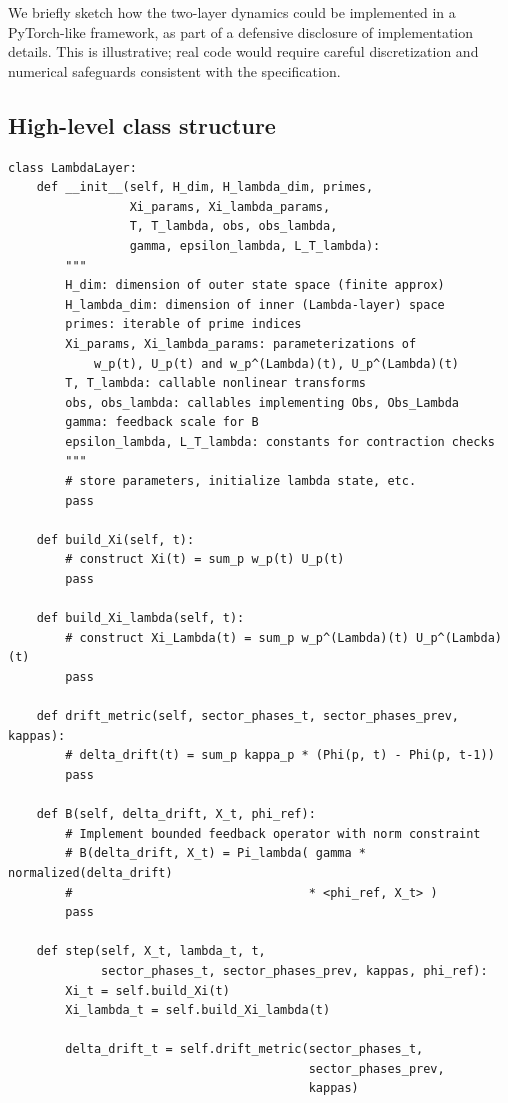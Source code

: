 \documentclass[11pt]{article}
\begin{document}
We briefly sketch how the two-layer dynamics could be implemented in a PyTorch-like framework, as part of a defensive disclosure of implementation details. This is illustrative; real code would require careful discretization and numerical safeguards consistent with the specification.

\subsection{High-level class structure}

\begin{verbatim}
class LambdaLayer:
    def __init__(self, H_dim, H_lambda_dim, primes, 
                 Xi_params, Xi_lambda_params,
                 T, T_lambda, obs, obs_lambda,
                 gamma, epsilon_lambda, L_T_lambda):
        """
        H_dim: dimension of outer state space (finite approx)
        H_lambda_dim: dimension of inner (Lambda-layer) space
        primes: iterable of prime indices
        Xi_params, Xi_lambda_params: parameterizations of 
            w_p(t), U_p(t) and w_p^(Lambda)(t), U_p^(Lambda)(t)
        T, T_lambda: callable nonlinear transforms
        obs, obs_lambda: callables implementing Obs, Obs_Lambda
        gamma: feedback scale for B
        epsilon_lambda, L_T_lambda: constants for contraction checks
        """
        # store parameters, initialize lambda state, etc.
        pass

    def build_Xi(self, t):
        # construct Xi(t) = sum_p w_p(t) U_p(t)
        pass

    def build_Xi_lambda(self, t):
        # construct Xi_Lambda(t) = sum_p w_p^(Lambda)(t) U_p^(Lambda)(t)
        pass

    def drift_metric(self, sector_phases_t, sector_phases_prev, kappas):
        # delta_drift(t) = sum_p kappa_p * (Phi(p, t) - Phi(p, t-1))
        pass

    def B(self, delta_drift, X_t, phi_ref):
        # Implement bounded feedback operator with norm constraint
        # B(delta_drift, X_t) = Pi_lambda( gamma * normalized(delta_drift)
        #                                 * <phi_ref, X_t> )
        pass

    def step(self, X_t, lambda_t, t,
             sector_phases_t, sector_phases_prev, kappas, phi_ref):
        Xi_t = self.build_Xi(t)
        Xi_lambda_t = self.build_Xi_lambda(t)

        delta_drift_t = self.drift_metric(sector_phases_t,
                                          sector_phases_prev,
                                          kappas)


\end{verbatim}
\end{document}
